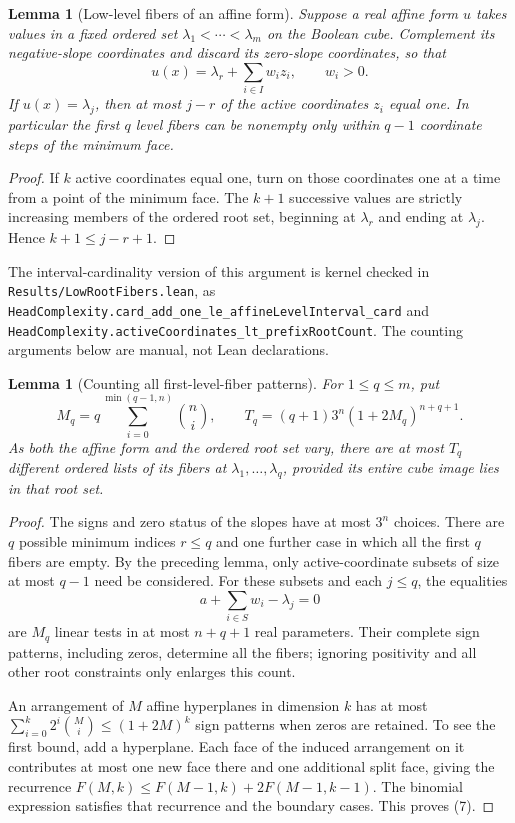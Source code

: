 \documentclass[11pt]{article}
\newtheorem{lemma}[theorem]{Lemma}
\begin{document}
\begin{lemma}[Low-level fibers of an affine form]
Suppose a real affine form $u$ takes values in a fixed ordered set
$\lambda_1<\cdots<\lambda_m$ on the Boolean cube. Complement its
negative-slope coordinates and discard its zero-slope coordinates,
so that
\[
              u(x)=\lambda_r+\sum_{i\in I}w_i z_i,
              \qquad w_i>0.
\]
If $u(x)=\lambda_j$, then at most $j-r$ of the active coordinates
$z_i$ equal one. In particular the first $q$ level fibers can be
nonempty only within $q-1$ coordinate steps of the minimum face.
\end{lemma}
\begin{proof}
If $k$ active coordinates equal one, turn on those coordinates one at
a time from a point of the minimum face. The $k+1$ successive values
are strictly increasing members of the ordered root set, beginning
at $\lambda_r$ and ending at $\lambda_j$. Hence $k+1\le j-r+1$.
\end{proof}

The interval-cardinality version of this argument is kernel checked in
\texttt{Results/LowRootFibers.lean}, as
\texttt{HeadComplexity.card\_add\_one\_le\_affineLevelInterval\_card}
and \texttt{HeadComplexity.activeCoordinates\_lt\_prefixRootCount}.
The counting arguments below are manual, not Lean declarations.

\begin{lemma}[Counting all first-level-fiber patterns]
For $1\le q\le m$, put
\[
 M_q=q\sum_{i=0}^{\min(q-1,n)}\binom ni,
 \qquad
 T_q=(q+1)3^n(1+2M_q)^{n+q+1}.
 \tag{7}
\]
As both the affine form and the ordered root set vary, there are at
most $T_q$ different ordered lists of its fibers at
$\lambda_1,\ldots,\lambda_q$, provided its entire cube image lies
in that root set.
\end{lemma}
\begin{proof}
The signs and zero status of the slopes have at most $3^n$ choices.
There are $q$ possible minimum indices $r\le q$ and one further
case in which all the first $q$ fibers are empty. By the preceding
lemma, only active-coordinate subsets of size at most $q-1$ need
be considered. For these subsets and each $j\le q$, the equalities
\[
                   a+\sum_{i\in S}w_i-\lambda_j=0
\]
are $M_q$ linear tests in at most $n+q+1$ real parameters.
Their complete sign patterns, including zeros, determine all the
fibers; ignoring positivity and all other root constraints only
enlarges this count.

An arrangement of $M$ affine hyperplanes in dimension $k$ has at
most $\sum_{i=0}^k2^i\binom Mi\le(1+2M)^k$ sign patterns when
zeros are retained. To see the first bound, add a hyperplane. Each
face of the induced arrangement on it contributes at most one new
face there and one additional split face, giving the recurrence
$F(M,k)\le F(M-1,k)+2F(M-1,k-1)$. The binomial expression satisfies
that recurrence and the boundary cases. This proves (7).
\end{proof}
\end{document}
